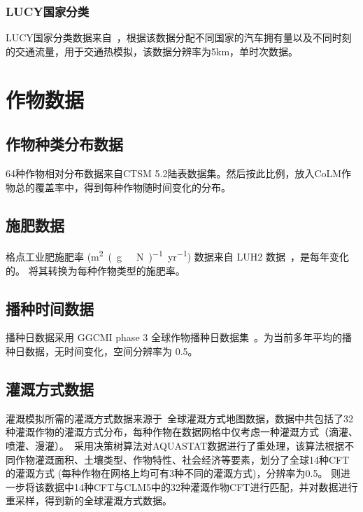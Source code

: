 \subsubsection{LUCY国家分类}\label{LUCY国家分类}
LUCY国家分类数据来自~\citet{allen2011}，根据该数据分配不同国家的汽车拥有量以及不同时刻的交通流量，用于交通热模拟，该数据分辨率为5km，单时次数据。


\section{作物数据}

\subsection{作物种类分布数据}\label{作物种类分布数据}
64种作物相对分布数据来自CTSM 5.2陆表数据集。然后按此比例，放入CoLM作物总的覆盖率中，得到每种作物随时间变化的分布。

\subsection{施肥数据}\label{施肥数据}
格点工业肥施肥率 (\unit{m^2.(g\ N)^{-1}.yr^{-1}}) 数据来自 LUH2 数据~\citep{hurtt2011harmonization}，是每年变化的。\citet{lawrence2016land} 将其转换为每种作物类型的施肥率。

\subsection{播种时间数据}\label{播种时间数据}
播种日数据采用 GGCMI phase 3 全球作物播种日数据集~\citep{jagermeyr2021climate}。为当前多年平均的播种日数据，无时间变化，空间分辨率为 0.5\textdegree。

\subsection{灌溉方式数据}\label{灌溉方式数据}
灌溉模拟所需的灌溉方式数据来源于~\citet{yao2022Irrigation}全球灌溉方式地图数据，数据中共包括了32种灌溉作物的灌溉方式分布，每种作物在数据网格中仅考虑一种灌溉方式（滴灌、喷灌、漫灌）。~\citet{jagermeyr2015irrigation}采用决策树算法对AQUASTAT数据\citep{fao2014aquastat}进行了重处理，该算法根据不同作物灌溉面积、土壤类型、作物特性、社会经济等要素，划分了全球14种CFT的灌溉方式 (每种作物在网格上均可有3种不同的灌溉方式)，分辨率为0.5\textdegree。\citet{yao2022Irrigation} 则进一步将该数据中14种CFT与CLM5中的32种灌溉作物CFT进行匹配，并对数据进行重采样，得到新的全球灌溉方式数据。

